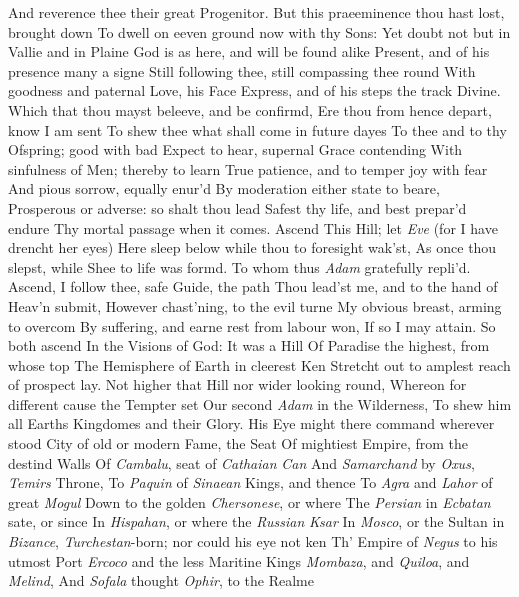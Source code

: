 \documentclass[11pt]{book}
\begin{document}
And reverence thee their great Progenitor. 
But this praeeminence thou hast lost, brought down 
To dwell on eeven ground now with thy Sons: 
Yet doubt not but in Vallie and in Plaine 
God is as here, and will be found alike 
Present, and of his presence many a signe 
Still following thee, still compassing thee round 
With goodness and paternal Love, his Face 
Express, and of his steps the track Divine. 
Which that thou mayst beleeve, and be confirmd, 
Ere thou from hence depart, know I am sent 
To shew thee what shall come in future dayes 
To thee and to thy Ofspring; good with bad 
Expect to hear, supernal Grace contending 
With sinfulness of Men; thereby to learn 
True patience, and to temper joy with fear 
And pious sorrow, equally enur'd 
By moderation either state to beare, 
Prosperous or adverse: so shalt thou lead 
Safest thy life, and best prepar'd endure 
Thy mortal passage when it comes.  Ascend 
This Hill; let \textit{Eve} (for I have drencht her eyes) 
Here sleep below while thou to foresight wak'st, 
As once thou slepst, while Shee to life was formd. 
\quad To whom thus \textit{Adam} gratefully repli'd. 
Ascend, I follow thee, safe Guide, the path 
Thou lead'st me, and to the hand of Heav'n submit, 
However chast'ning, to the evil turne 
My obvious breast, arming to overcom 
By suffering, and earne rest from labour won, 
If so I may attain.  So both ascend 
In the Visions of God:  It was a Hill 
Of Paradise the highest, from whose top 
The Hemisphere of Earth in cleerest Ken 
Stretcht out to amplest reach of prospect lay. 
Not higher that Hill nor wider looking round, 
Whereon for different cause the Tempter set 
Our second \textit{Adam} in the Wilderness, 
To shew him all Earths Kingdomes and their Glory. 
His Eye might there command wherever stood 
City of old or modern Fame, the Seat 
Of mightiest Empire, from the destind Walls 
Of \textit{Cambalu}, seat of \textit{Cathaian} \textit{Can} 
And \textit{Samarchand} by \textit{Oxus}, \textit{Temirs} Throne, 
To \textit{Paquin} of \textit{Sinaean} Kings, and thence 
To \textit{Agra} and \textit{Lahor} of great \textit{Mogul} 
Down to the golden \textit{Chersonese}, or where 
The \textit{Persian} in \textit{Ecbatan} sate, or since 
In \textit{Hispahan}, or where the \textit{Russian} \textit{Ksar} 
In \textit{Mosco}, or the Sultan in \textit{Bizance}, 
\textit{Turchestan}-born; nor could his eye not ken 
Th' Empire of \textit{Negus} to his utmost Port 
\textit{Ercoco} and the less Maritine Kings 
\textit{Mombaza}, and \textit{Quiloa}, and \textit{Melind}, 
And \textit{Sofala} thought \textit{Ophir}, to the Realme 
\end{document}
